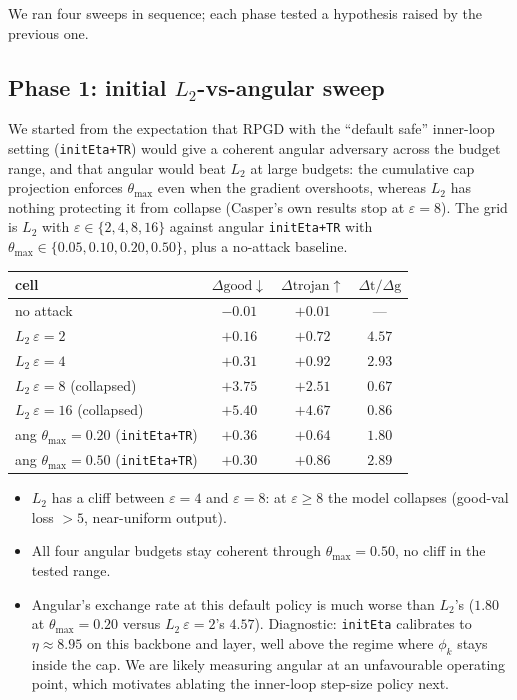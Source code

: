 \documentclass[11pt]{article}
\newcommand{\thmax}{\theta_{\max}}
\newcommand{\eps}{\varepsilon}
\begin{document}
We ran four sweeps in sequence; each phase tested a hypothesis raised by the previous one.

\subsection{Phase 1: initial $L_2$-vs-angular sweep}

We started from the expectation that RPGD with the ``default safe'' inner-loop setting (\texttt{initEta+TR}) would give a coherent angular adversary across the budget range, and that angular would beat $L_2$ at large budgets: the cumulative cap projection enforces $\thmax$ even when the gradient overshoots, whereas $L_2$ has nothing protecting it from collapse (Casper's own results stop at $\eps{=}8$). The grid is $L_2$ with $\eps \in \{2, 4, 8, 16\}$ against angular \texttt{initEta+TR} with $\thmax \in \{0.05, 0.10, 0.20, 0.50\}$, plus a no-attack baseline.

\begin{table}[h]
\centering\small
\begin{tabular}{lccc}
\toprule
\textbf{cell} & $\Delta\text{good}\downarrow$ & $\Delta\text{trojan}\uparrow$ & $\Delta\text{t}/\Delta\text{g}$ \\
\midrule
no attack & $-0.01$ & $+0.01$ & --- \\
$L_2\ \eps{=}2$ & $+0.16$ & $+0.72$ & $4.57$ \\
$L_2\ \eps{=}4$ & $+0.31$ & $+0.92$ & $2.93$ \\
$L_2\ \eps{=}8$ (collapsed) & $+3.75$ & $+2.51$ & $0.67$ \\
$L_2\ \eps{=}16$ (collapsed) & $+5.40$ & $+4.67$ & $0.86$ \\
ang $\thmax{=}0.20$ (\texttt{initEta+TR}) & $+0.36$ & $+0.64$ & $1.80$ \\
ang $\thmax{=}0.50$ (\texttt{initEta+TR}) & $+0.30$ & $+0.86$ & $2.89$ \\
\bottomrule
\end{tabular}
\end{table}

\begin{itemize}[leftmargin=*]
\item $L_2$ has a cliff between $\eps{=}4$ and $\eps{=}8$: at $\eps \ge 8$ the model collapses (good-val loss $> 5$, near-uniform output).
\item All four angular budgets stay coherent through $\thmax{=}0.50$, no cliff in the tested range.
\item Angular's exchange rate at this default policy is much worse than $L_2$'s ($1.80$ at $\thmax{=}0.20$ versus $L_2\ \eps{=}2$'s $4.57$). Diagnostic: \texttt{initEta} calibrates to $\eta \approx 8.95$ on this backbone and layer, well above the regime where $\phi_k$ stays inside the cap. We are likely measuring angular at an unfavourable operating point, which motivates ablating the inner-loop step-size policy next.
\end{itemize}
\end{document}
